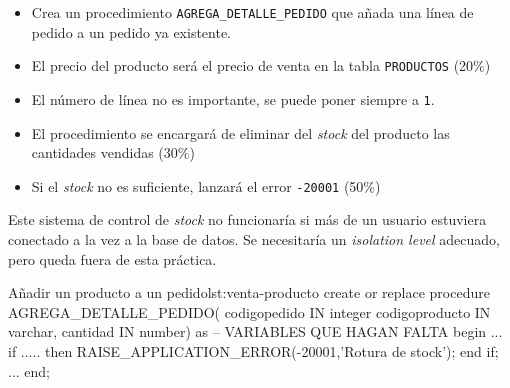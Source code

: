 \begin{homeworkProblem}

  \begin{itemize}
  \item Crea un procedimiento \texttt{AGREGA\_DETALLE\_PEDIDO} que añada una línea de pedido a un pedido ya existente.
  \item El precio del producto será el precio de venta en la tabla \texttt{PRODUCTOS} (20\%)
  \item El número de línea no es importante, se puede poner siempre a \texttt{1}.
  \item El procedimiento se encargará de eliminar del \textit{stock} del producto las cantidades vendidas (30\%)
  \item Si el \textit{stock} no es suficiente, lanzará el error \texttt{-20001} (50\%)
  \end{itemize}


  \begin{Aviso}
    Este sistema de control de \textit{stock} no funcionaría si más de un usuario estuviera conectado a la vez a la base de datos. Se necesitaría un \textit{isolation level} adecuado, pero queda fuera de esta práctica.
  \end{Aviso}
  
  \begin{listadosql}{Añadir un producto a un pedido}{lst:venta-producto}
create or replace procedure AGREGA_DETALLE_PEDIDO(
  codigopedido IN integer
  codigoproducto IN varchar,
  cantidad IN number)
as
  -- VARIABLES QUE HAGAN FALTA
begin
  ...
  if ..... then
    RAISE_APPLICATION_ERROR(-20001,'Rotura de stock');
  end if;
  ...
end; 
  \end{listadosql}


\end{homeworkProblem}



